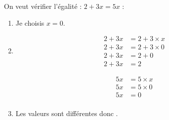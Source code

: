 \documentclass[12pt,a4paper]{article}
\begin{document}
\begin{myex}
	
		On veut vérifier l'égalité : $2 + 3x = 5x$ :
			\begin{enumerate}
				\item Je choisis $x=0$.
				\item 
				
					\begin{multicols}{2}
						\begin{align*}
							2 + 3x &= 2 + 3 \times x \\
							2 + 3x &= 2 + 3 \times 0 \\
							2 + 3x &= 2 + 0 \\
							2 + 3x &= 2
						\end{align*}
						
						
						\begin{align*}
							5x &= 5 \times x \\
							5x &= 5 \times 0 \\
							5x &= 0 \\							
						\end{align*}
					\end{multicols}
				
				\item Les valeurs sont différentes donc .
			\end{enumerate}
	
\end{myex}
\end{document}
